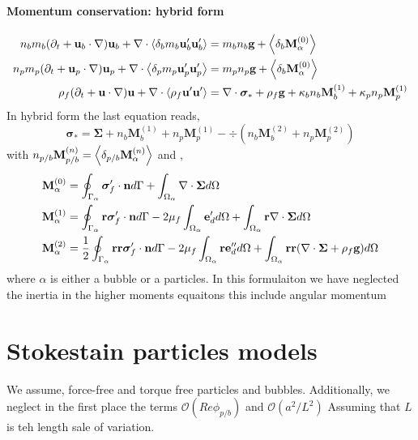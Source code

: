 \documentclass[12pt]{My_preprint}
\begin{document}
\paragraph*{Momentum conservation: hybrid form}
\begin{align}
    n_b m_b (\pddt + \textbf{u}_b\cdot  \grad) \textbf{u}_b
    + \div \pavg[b]{ m_b \textbf{u}_b' \textbf{u}_b'}
    &= 
    m_b n_b \textbf{g}
    + \pavg[b]{\textbf{M}^{(0)}_\alpha}
    \\
    n_p m_p (\pddt + \textbf{u}_p\cdot  \grad) \textbf{u}_p
    + \div \pavg{ m_p \textbf{u}_p' \textbf{u}_p'}
    &= 
    m_p n_p \textbf{g}
    + \pavg[b]{\textbf{M}^{(0)}_\alpha}
    \\
    \rho_f (\pddt + \textbf{u} \cdot \grad)\textbf{u}
    + \div \avg{\rho_f \textbf{u}' \textbf{u}'}
    &= 
    \div \bm\sigma_*
    + \rho_f \textbf{g}
    +\kappa_b   n_b \textbf{M}_b^{(1)}
    +\kappa_p   n_p \textbf{M}_p^{(1)}
\end{align}
In hybrid form the last equation reads, 
\begin{equation}
    \bm\sigma_* 
    =
    \bm\Sigma
    +  n_b \textbf{M}_b^{(1)}
    +  n_p \textbf{M}_p^{(1)}
    -\div (  n_b \textbf{M}_b^{(2)}
    +  n_p \textbf{M}_p^{(2)})
\end{equation}
with $n_{p/b} \textbf{M}_{p/b}^{(n)} = \pavg[p/b]{\textbf{M}_\alpha^{(n)}}$ and , 
\begin{align}
    \textbf{M}_\alpha^{(0)} &=
    \intS{\bm{\sigma}_f' \cdot \textbf{n}}
   +\intO{\div \bm\Sigma}
   \\
   \textbf{M}_\alpha^{(1)} &=
   \intS{\textbf{r}\bm{\sigma}_f' \cdot \textbf{n}}
   -2\mu_f \intO{\textbf{e}_d'}
   +\intO{\textbf{r}\div \bm\Sigma}
   \\
   \textbf{M}_\alpha^{(2)} &=
   \frac{1}{2}\intS{\textbf{rr}\bm{\sigma}_f' \cdot \textbf{n}}
   -2\mu_f \intO{\textbf{re}_d''}
   +\intO{\textbf{rr}(\div \bm\Sigma+ \rho_f\textbf{g})}
    \\
\end{align}
where $\alpha$ is either a bubble or a particles. 
In this formulaiton we have neglected the inertia in the higher moments equaitons this include angular momentum 


\section{Stokestain particles models}
We assume, force-free and torque free particles and bubbles. 
Additionally, we neglect in the first place the terms $\mathcal{O}(Re \phi_{p/b})$ and $\mathcal{O}(a^2/L^2)$ Assuming that $L$ is teh length sale of variation. 
\end{document}
